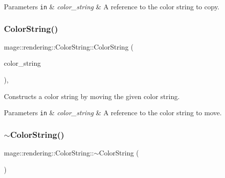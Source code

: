 \begin{DoxyParams}[1]{Parameters}
\mbox{\tt in}  & {\em color\+\_\+string} & A reference to the color string to copy. \\
\hline
\end{DoxyParams}
\hypertarget{classmage_1_1rendering_1_1_color_string_a642793608186e9ac9931827ae9f0c57a}{}\label{classmage_1_1rendering_1_1_color_string_a642793608186e9ac9931827ae9f0c57a} 
\subsubsection{\texorpdfstring{Color\+String()}{ColorString()}\hspace{0.1cm}{\footnotesize\ttfamily [3/3]}}
{\footnotesize\ttfamily mage\+::rendering\+::\+Color\+String\+::\+Color\+String (\begin{DoxyParamCaption}\item[{\hyperlink{classmage_1_1rendering_1_1_color_string}{Color\+String} \&\&}]{color\+\_\+string }\end{DoxyParamCaption})\hspace{0.3cm}{\ttfamily [default]}, {\ttfamily [noexcept]}}

Constructs a color string by moving the given color string.


\begin{DoxyParams}[1]{Parameters}
\mbox{\tt in}  & {\em color\+\_\+string} & A reference to the color string to move. \\
\hline
\end{DoxyParams}
\hypertarget{classmage_1_1rendering_1_1_color_string_a13ab2218e1cbe99241283214e455f3c9}{}\label{classmage_1_1rendering_1_1_color_string_a13ab2218e1cbe99241283214e455f3c9} 
\subsubsection{\texorpdfstring{$\sim$\+Color\+String()}{~ColorString()}}
{\footnotesize\ttfamily mage\+::rendering\+::\+Color\+String\+::$\sim$\+Color\+String (\begin{DoxyParamCaption}{ }\end{DoxyParamCaption})\hspace{0.3cm}{\ttfamily [default]}}

